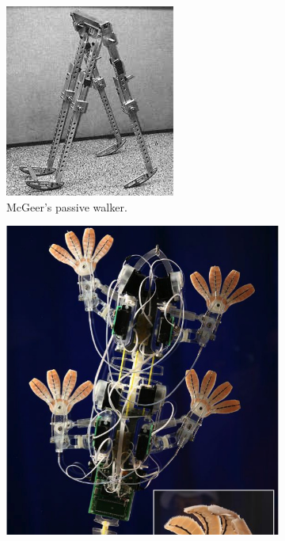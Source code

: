 \begin{figure}[htb]
	\centering
	\begin{subfigure}[b]{0.45\textwidth}
        \includegraphics[width=\textwidth]{figures/passive_walker.jpg}
        \caption{McGeer's passive walker.}
        \label{fig:passive_walker}
    \end{subfigure}
    \begin{subfigure}[b]{0.45\textwidth}
        \includegraphics[width=\textwidth]{figures/Stickybot.jpg}

\end{subfigure}
\end{figure}

